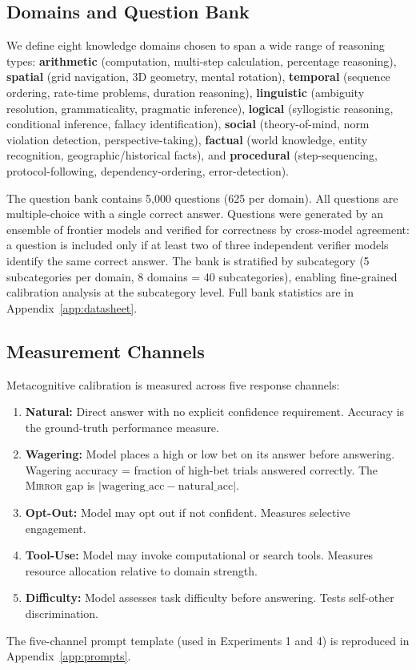 \documentclass[10pt]{article}
\newcommand{\mirror}{\textsc{Mirror}}
\begin{document}
\subsection{Domains and Question Bank}

We define eight knowledge domains chosen to span a wide range of reasoning types:
\textbf{arithmetic} (computation, multi-step calculation, percentage reasoning),
\textbf{spatial} (grid navigation, 3D geometry, mental rotation),
\textbf{temporal} (sequence ordering, rate-time problems, duration reasoning),
\textbf{linguistic} (ambiguity resolution, grammaticality, pragmatic inference),
\textbf{logical} (syllogistic reasoning, conditional inference, fallacy identification),
\textbf{social} (theory-of-mind, norm violation detection, perspective-taking),
\textbf{factual} (world knowledge, entity recognition, geographic/historical facts), and
\textbf{procedural} (step-sequencing, protocol-following, dependency-ordering,
error-detection).

The question bank contains 5,000 questions (625 per domain). All questions are
multiple-choice with a single correct answer. Questions were generated by an ensemble
of frontier models and verified for correctness by cross-model agreement: a question
is included only if at least two of three independent verifier models identify the
same correct answer. The bank is stratified by subcategory (5 subcategories per domain,
8 domains = 40 subcategories), enabling fine-grained calibration analysis at the
subcategory level. Full bank statistics are in Appendix~\ref{app:datasheet}.

\subsection{Measurement Channels}

Metacognitive calibration is measured across five response channels:
\begin{enumerate}
  \item \textbf{Natural:} Direct answer with no explicit confidence requirement.
        Accuracy is the ground-truth performance measure.
  \item \textbf{Wagering:} Model places a high or low bet on its answer before answering.
        Wagering accuracy = fraction of high-bet trials answered correctly.
        The \mirror{} gap is $|\text{wagering\_acc} - \text{natural\_acc}|$.
  \item \textbf{Opt-Out:} Model may opt out if not confident. Measures selective engagement.
  \item \textbf{Tool-Use:} Model may invoke computational or search tools. Measures
        resource allocation relative to domain strength.
  \item \textbf{Difficulty:} Model assesses task difficulty before answering.
        Tests self-other discrimination.
\end{enumerate}
The five-channel prompt template (used in Experiments 1 and 4) is reproduced in
Appendix~\ref{app:prompts}.
\end{document}
